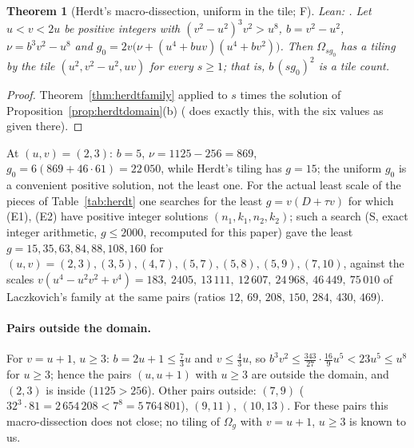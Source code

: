 \documentclass[11pt,reqno]{amsart}
\theoremstyle{plain}
\newtheorem{theorem}{Theorem}[section]
\theoremstyle{definition}
\newcommand{\sF}{\textup{\textsf{F}}}
\newcommand{\sS}{\textup{\textsf{S}}}
\begin{document}
\begin{theorem}[Herdt's macro-dissection, uniform in the tile; \sF{}]\label{thm:herdt}
{\small\noindent\emph{Lean:} .}
Let $u<v<2u$ be positive integers with $(v^2-u^2)^3v^2>u^8$, $b=v^2-u^2$, $\nu =b^3v^2-u^8$ and $g_0=2v\bigl(\nu +(u^4+buv)(u^4+bv^2)\bigr)$. Then $\Omega_{sg_0}$ has a tiling by the tile $(u^2,v^2-u^2,uv)$ for every
$s\ge1$; that is, $b\,(sg_0)^2$ is a tile count.
\end{theorem}
\begin{proof}
Theorem~\ref{thm:herdtfamily} applied to $s$ times the solution of Proposition~\ref{prop:herdtdomain}(b) ( does exactly this, with the six values as given there).
\end{proof}
At $(u,v)=(2,3)$: $b=5$, $\nu =1125-256=869$, $g_0=6(869+46\cdot61)=22\,050$, while Herdt's tiling has $g=15$; the uniform $g_0$ is a convenient positive solution, not the least one. For the actual least scale of the pieces of Table~\ref{tab:herdt} one searches for the least $g=v(D+\tau v)$ for which (E1), (E2) have positive integer solutions $(n_1,k_1,n_2,k_2)$; such a search (\sS, exact integer arithmetic, $g\le2000$, recomputed for this paper) gave the least $g=15,35,63,84,88,108,160$ for $(u,v)=(2,3),(3,5),(4,7),(5,7),(5,8),(5,9),(7,10)$, against the scales $v(u^4-u^2v^2+v^4)=183,\ 2405,\ 13\,111,\ 12\,607,\ 24\,968,\ 46\,449,\ 75\,010$ of Laczkovich's family at the same pairs (ratios $12$, $69$, $208$, $150$, $284$, $430$, $469$).

\paragraph{Pairs outside the domain.} For $v=u+1$, $u\ge3$: $b=2u+1\le\frac73u$ and $v\le\frac43u$, so $b^3v^2\le\frac{343}{27}\cdot\frac{16}{9}u^5<23u^5\le u^8$ for $u\ge3$; hence the pairs $(u,u+1)$ with $u\ge3$ are outside the domain, and $(2,3)$ is inside ($1125>256$). Other pairs outside: $(7,9)$ ($32^3\cdot81=2\,654\,208<7^8=5\,764\,801$), $(9,11)$, $(10,13)$. For these pairs this macro-dissection does not close; no tiling of $\Omega_{g}$ with $v=u+1$, $u\ge3$ is known to us.
\end{document}
